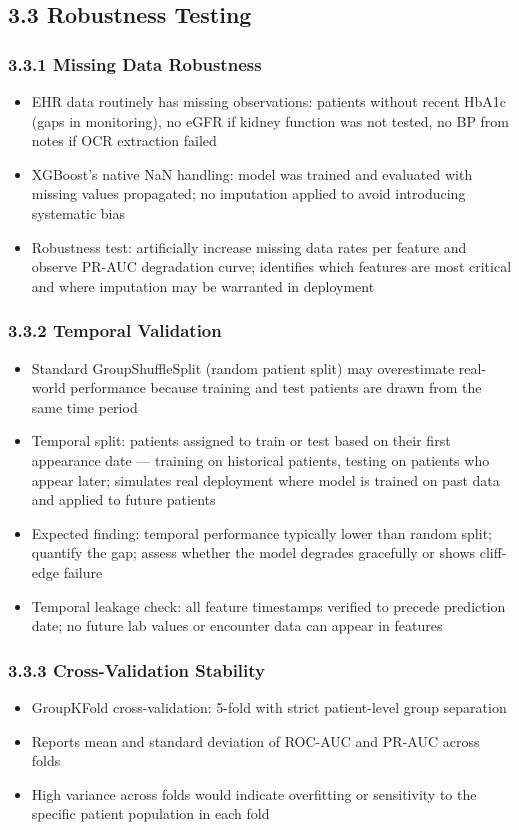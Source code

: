 \documentclass[11pt,a4paper]{article}
\begin{document}
\subsection{3.3 Robustness Testing}

\subsubsection{3.3.1 Missing Data Robustness}
\begin{itemize}
\item EHR data routinely has missing observations: patients without recent HbA1c (gaps in monitoring), no eGFR if kidney function was not tested, no BP from notes if OCR extraction failed
\item XGBoost's native NaN handling: model was trained and evaluated with missing values propagated; no imputation applied to avoid introducing systematic bias
\item Robustness test: artificially increase missing data rates per feature and observe PR-AUC degradation curve; identifies which features are most critical and where imputation may be warranted in deployment
\end{itemize}

\subsubsection{3.3.2 Temporal Validation}
\begin{itemize}
\item Standard GroupShuffleSplit (random patient split) may overestimate real-world performance because training and test patients are drawn from the same time period
\item Temporal split: patients assigned to train or test based on their first appearance date --- training on historical patients, testing on patients who appear later; simulates real deployment where model is trained on past data and applied to future patients
\item Expected finding: temporal performance typically lower than random split; quantify the gap; assess whether the model degrades gracefully or shows cliff-edge failure
\item Temporal leakage check: all feature timestamps verified to precede prediction date; no future lab values or encounter data can appear in features
\end{itemize}

\subsubsection{3.3.3 Cross-Validation Stability}
\begin{itemize}
\item GroupKFold cross-validation: 5-fold with strict patient-level group separation
\item Reports mean and standard deviation of ROC-AUC and PR-AUC across folds
\item High variance across folds would indicate overfitting or sensitivity to the specific patient population in each fold
\end{itemize}
\end{document}
